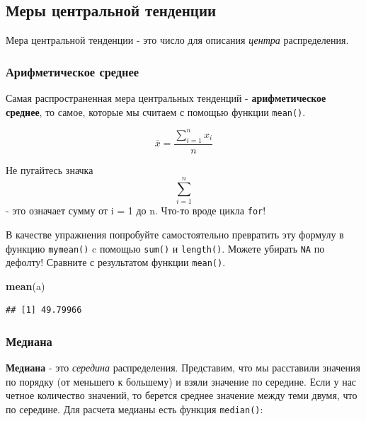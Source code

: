 \documentclass[]{book}
\newenvironment{Shaded}{\begin{snugshade}}{\end{snugshade}}
\newcommand{\KeywordTok}[1]{\textcolor[rgb]{0.13,0.29,0.53}{\textbf{#1}}}
\newcommand{\StringTok}[1]{\textcolor[rgb]{0.31,0.60,0.02}{#1}}
\newcommand{\OperatorTok}[1]{\textcolor[rgb]{0.81,0.36,0.00}{\textbf{#1}}}
\newcommand{\NormalTok}[1]{#1}
\begin{document}
\begin{Shaded}
\end{Shaded}

\subsection{Меры центральной тенденции}\label{cent_tend}

Мера центральной тенденции - это число для описания \emph{центра}
распределения.

\subsubsection{Арифметическое среднее}\label{mean}

Самая распространенная мера центральных тенденций -
\textbf{арифметическое среднее}, то самое, которые мы считаем с помощью
функции \texttt{mean()}.

\[\overline{x}= \frac{\sum\limits_{i=1}^{n} x_{i}} {n}\]

Не пугайтесь значка \[\sum\limits_{i=1}^{n}\] - это означает сумму от i
= 1 до n. Что-то вроде цикла \texttt{for}!

В качестве упражнения попробуйте самостоятельно превратить эту формулу в
функцию \texttt{mymean()} c помощью \texttt{sum()} и \texttt{length()}.
Можете убирать \texttt{NA} по дефолту! Сравните с результатом функции
\texttt{mean()}.

\begin{Shaded}
\begin{Highlighting}[]
\KeywordTok{mean}\NormalTok{(a)}
\end{Highlighting}
\end{Shaded}

\begin{verbatim}
## [1] 49.79966
\end{verbatim}

\subsubsection{Медиана}\label{median}

\textbf{Медиана} - это \emph{середина} распределения. Представим, что мы
расставили значения по порядку (от меньшего к большему) и взяли значение
по середине. Если у нас четное количество значений, то берется среднее
значение между теми двумя, что по середине. Для расчета медианы есть
функция \texttt{median()}:
\end{document}
